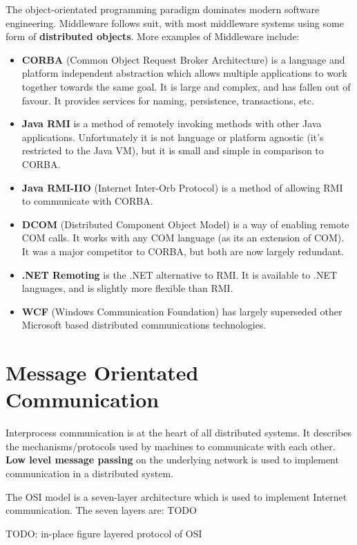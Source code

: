 \documentclass{article}
\begin{document}
The object-orientated programming paradigm dominates modern software engineering. Middleware follows suit, with most middleware systems using some form of \textbf{distributed objects}. More examples of Middleware include:
\begin{itemize}
    \item \textbf{CORBA} (Common Object Request Broker Architecture) is a language and platform independent abstraction which allows multiple applications to work together towards the same goal. It is large and complex, and has fallen out of favour. It provides services for naming, persistence, transactions, etc.
    \item \textbf{Java RMI} is a method of remotely invoking methods with other Java applications. Unfortunately it is not language or platform agnostic (it's restricted to the Java VM), but it is small and simple in comparison to CORBA.
    \item \textbf{Java RMI-IIO} (Internet Inter-Orb Protocol) is a method of allowing RMI to communicate with CORBA.
    \item \textbf{DCOM} (Distributed Component Object Model) is a way of enabling remote COM calls. It works with any COM language (as its an extension of COM). It was a major competitor to CORBA, but both are now largely redundant.
    \item \textbf{.NET Remoting} is the .NET alternative to RMI. It is available to .NET languages, and is slightly more flexible than RMI.
    \item \textbf{WCF} (Windows Communication Foundation) has largely superseded other Microsoft based distributed communications technologies.
\end{itemize}

\section{Message Orientated Communication}

Interprocess communication is at the heart of all distributed systems. It describes the mechanisms/protocols used by machines to communicate with each other. \textbf{Low level message passing} on the underlying network is used to implement communication in a distributed system.

The OSI model is a seven-layer architecture which is used to implement Internet communication. The seven layers are:
TODO

TODO: in-place figure layered protocol of OSI
\end{document}
